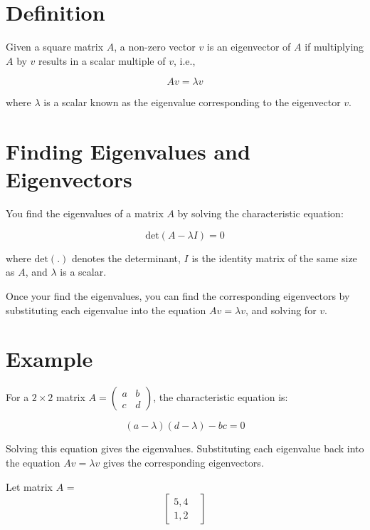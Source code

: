 \section{Definition}

Given a square matrix $A$, a non-zero vector $v$ is an eigenvector of
$A$ if multiplying $A$ by $v$ results in a scalar multiple of $v$,
i.e.,

\begin{equation}
Av = \lambda v
\end{equation}

where $\lambda$ is a scalar known as the eigenvalue corresponding to the eigenvector $v$.

\section{Finding Eigenvalues and Eigenvectors}

You find the eigenvalues of a matrix $A$  by solving the characteristic equation:

\begin{equation}
\text{det}(A - \lambda I) = 0
\end{equation}

where $\text{det}(.)$ denotes the determinant, $I$ is the identity
matrix of the same size as $A$, and $\lambda$ is a scalar.

Once your find the eigenvalues, you can find the corresponding eigenvectors by substituting each eigenvalue into the equation $Av = \lambda
v$, and solving for $v$.

\section{Example}

For a $2 \times 2$ matrix $A = \begin{pmatrix} a & b \\ c &
  d \end{pmatrix}$, the characteristic equation is:

\begin{equation}
(a - \lambda)(d - \lambda) - bc = 0
\end{equation}

Solving this equation  gives the eigenvalues. Substituting each
eigenvalue back into the equation $Av = \lambda v$ gives the
corresponding eigenvectors.

Let matrix $A$ =
$$\begin{bmatrix}
5,4 &\\
 1,2& 
\end{bmatrix} $$

